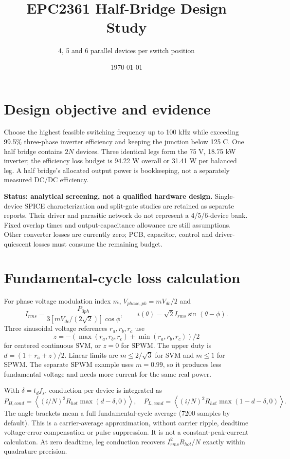﻿\documentclass[a4paper,10pt]{article}
\title{EPC2361 Half-Bridge Design Study}
\author{4, 5 and 6 parallel devices per switch position}
\date{\today}
\begin{document}
\maketitle
\section{Design objective and evidence}
Choose the highest feasible switching frequency up to 100 kHz while exceeding
99.5\% three-phase inverter efficiency and keeping the junction below 125 C.
One half bridge contains $2N$ devices. Three identical legs form the 75 V,
18.75 kW inverter; the efficiency loss budget is 94.22 W overall or 31.41 W
per balanced leg. A half bridge's allocated output power is bookkeeping,
not a separately measured DC/DC efficiency.

\textbf{Status: analytical screening, not a qualified hardware design.}
Single-device SPICE characterization and split-gate studies are retained as
separate reports. Their driver and parasitic network do not represent a
4/5/6-device bank. Fixed overlap times and output-capacitance allowance are
still assumptions. Other converter losses are currently zero; PCB, capacitor,
control and driver-quiescent losses must consume the remaining budget.

\section{Fundamental-cycle loss calculation}
For phase voltage modulation index $m$, $V_{phase,pk}=mV_{dc}/2$ and
\[I_{rms}=\frac{P_{3ph}}{3[mV_{dc}/(2\sqrt{2})]\cos\phi},\qquad
 i(\theta)=\sqrt{2}I_{rms}\sin(\theta-\phi).\]
Three sinusoidal voltage references $r_a,r_b,r_c$ use
\[z=-(\max(r_a,r_b,r_c)+\min(r_a,r_b,r_c))/2\]
for centered continuous SVM, or $z=0$ for SPWM. The upper duty is
$d=(1+r_a+z)/2$. Linear limits are $m\le2/\sqrt{3}$ for SVM and $m\le1$
for SPWM. The separate SPWM example uses $m=0.99$, so it produces less
fundamental voltage and needs more current for the same real power.

With $\delta=t_df_s$, conduction per device is integrated as
\[P_{H,cond}=\left\langle(i/N)^2R_{hot}\max(d-\delta,0)\right\rangle,
\quad P_{L,cond}=\left\langle(i/N)^2R_{hot}\max(1-d-\delta,0)\right\rangle.\]
The angle brackets mean a full fundamental-cycle average (7200 samples by
default). This is a carrier-average approximation, without carrier ripple,
deadtime voltage-error compensation or pulse suppression. It is not a
constant-peak-current calculation. At zero deadtime, leg conduction recovers
$I_{rms}^2R_{hot}/N$ exactly within quadrature precision.
\end{document}
